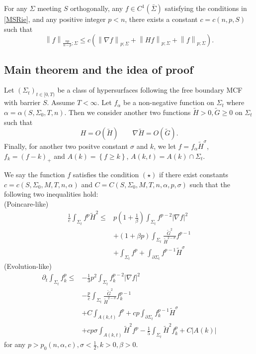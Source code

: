 \begin{theorem} \label{MSfree}
    For any $\Sigma $ meeting $S$ orthogonally, any $f \in C^{1}(\bar{\Sigma })$ satisfying the conditions in \autoref{MSRie}, and any positive integer $p<n$, there exists a constant $c=c(n,p,S)$ such that 
    \[\left\| f \right\| _{\frac{np}{n-p};\Sigma } \leq c(\left\| \nabla f \right\| _{p;\Sigma }+\left\| Hf \right\| _{p;\Sigma }+\left\|  f \right\| _{p;\Sigma }).\] 
\end{theorem}

\subsection{Main theorem and the idea of proof}

Let $\left( \Sigma _t \right) _{t \in [0,T)}$ be a class of hypersurfaces following the free boundary MCF with barrier $S$. Assume $T<\infty $. Let $f_{\alpha }$ be a non-negative function on $\Sigma _t$ where $\alpha = \alpha (S, \Sigma _0,T,n)$. Then we consider another two functions $\tilde{H}>0,\tilde{G}\geq 0$ on $\Sigma _t$ such that 
\[
    H=O(\tilde{H}) \qquad \nabla \tilde{H}=O(\tilde{G}).    
\]
Finally, for another two positve constant $\sigma$ and $k$, we let $f=f_{\alpha }\tilde{H}^{\sigma }$, $f_k=\left( f-k \right) _{+}$ and $A(k)=\left\{ f \geq k \right\} $, $A(k,t)=A(k)\cap \Sigma _t$.

We say the function $f$ satisfies the condition $(\star)$ if there exist constants $c=c(S, \Sigma_0,M,T,n,\alpha )$ and $C=C(S,\Sigma _0,M,T,n,\alpha ,p,\sigma )$ such that the following two inequalities hold:\\
(Poincare-like)
\begin{equation} \label{PLE}
\begin{split}
    \frac{1}{c}\int_{\Sigma_t} f^p \tilde{H}^2 
\leq &  p \left( 1+\frac{1}{\beta } \right) \int_{\Sigma_t} f^{p-2}\left| \nabla f \right| ^2  \\
&+\left( 1+\beta p \right) \int_{\Sigma_t} \frac{\tilde{G}^2}{\tilde{H}^{2-\sigma }}f^{p-1}\\
&+\int_{\Sigma_t} f^p+\int_{\partial \Sigma_t} f^{p-1}\tilde{H}^{\sigma }
\end{split}
\end{equation}
(Evolution-like)
\begin{equation} \label{ELE}
    \begin{split}
        \partial_t \int_{\Sigma_t} f_k^p
    \leq &  -\frac{1}{3}p^2 \int_{\Sigma_t} f_{k}^{p-2}\left| \nabla f \right| ^2  \\
    &-\frac{p}{c} \int_{\Sigma_t} \frac{\tilde{G}^2}{\tilde{H}^{2-\sigma }}f_{k}^{p-1}\\
    &+C \int_{A(k,t)} f^p+cp\int_{\partial \Sigma_t} f_{k}^{p-1}\tilde{H}^{\sigma }\\
    &+cp \sigma \int_{A(k,t)}^{}\tilde{H}^2f^p-\frac{1}{5}\int_{\Sigma_t} \tilde{H}^2f_{k}^{p}+C \left| A(k) \right| 
    \end{split}
    \end{equation}
for any $p>p_0(n,\alpha ,c), \sigma <\frac{1}{2}, k>0, \beta >0$. 

